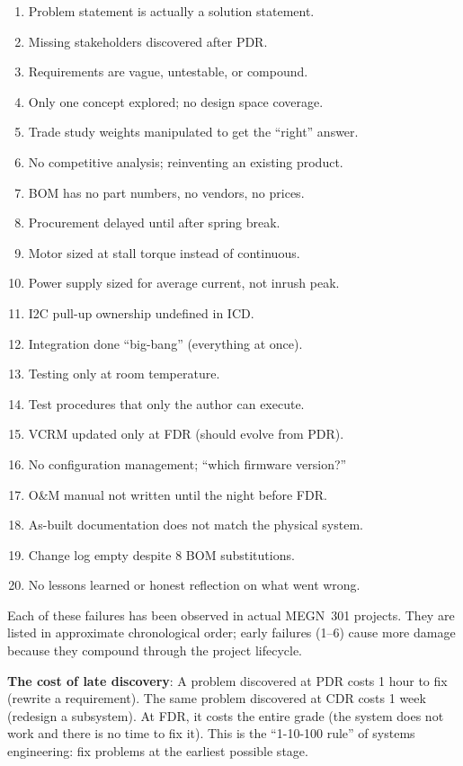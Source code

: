 \documentclass[11pt,letterpaper,twoside,openany]{book}
\begin{document}
\begin{enumerate}[leftmargin=1.5em]
\item Problem statement is actually a solution statement.
\item Missing stakeholders discovered after PDR.
\item Requirements are vague, untestable, or compound.
\item Only one concept explored; no design space coverage.
\item Trade study weights manipulated to get the ``right'' answer.
\item No competitive analysis; reinventing an existing product.
\item BOM has no part numbers, no vendors, no prices.
\item Procurement delayed until after spring break.
\item Motor sized at stall torque instead of continuous.
\item Power supply sized for average current, not inrush peak.
\item I2C pull-up ownership undefined in ICD.
\item Integration done ``big-bang'' (everything at once).
\item Testing only at room temperature.
\item Test procedures that only the author can execute.
\item VCRM updated only at FDR (should evolve from PDR).
\item No configuration management; ``which firmware version?''
\item O\&M manual not written until the night before FDR.
\item As-built documentation does not match the physical system.
\item Change log empty despite 8 BOM substitutions.
\item No lessons learned or honest reflection on what went wrong.
\end{enumerate}


Each of these failures has been observed in actual MEGN~301 projects. They are listed in approximate chronological order; early failures (1--6) cause more damage because they compound through the project lifecycle.

\textbf{The cost of late discovery}: A problem discovered at PDR costs 1 hour to fix (rewrite a requirement). The same problem discovered at CDR costs 1 week (redesign a subsystem). At FDR, it costs the entire grade (the system does not work and there is no time to fix it). This is the ``1-10-100 rule'' of systems engineering: fix problems at the earliest possible stage.
\end{document}
